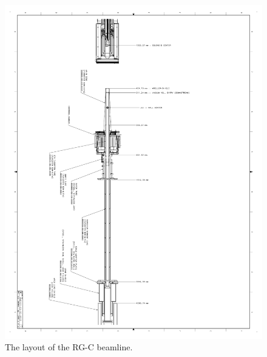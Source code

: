 \documentclass[12pt]{article}
\begin{document}
\begin{figure}[hbt]
\vspace{-2cm}
\begin{center}
\includegraphics[width=6in]{rgm_beam_page3.pdf}
\end{center}
\caption{ \label{fig:beamline3} 
The layout of the RG-C beamline. }
\end{figure}
\end{document}
